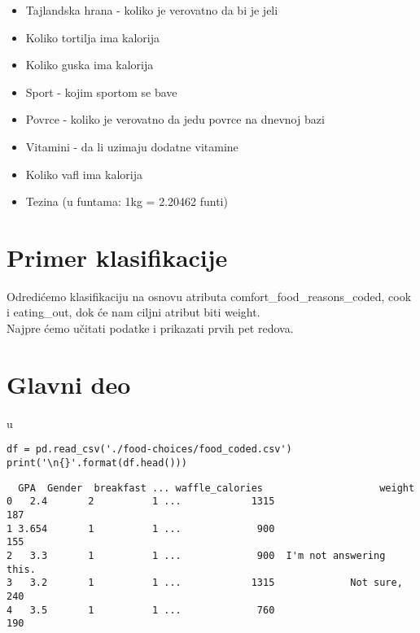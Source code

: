 \documentclass[12pt,a4paper]{article}
\begin{document}
\begin{itemize}
  \item Tajlandska hrana - koliko je verovatno da bi je jeli\\
  \item Koliko tortilja ima kalorija\\
  \item Koliko guska ima kalorija\\
  \item Sport - kojim sportom se bave\\
  \item Povrce - koliko je verovatno da jedu povrce na dnevnoj bazi\\
  \item Vitamini - da li uzimaju dodatne vitamine\\
  \item Koliko vafl ima kalorija\\
  \item Tezina (u funtama: 1kg = 2.20462 funti)\\
\end{itemize}

\section{Primer klasifikacije}

Odredi\' cemo klasifikaciju na osnovu atributa comfort\_food\_reasons\_coded, cook i eating\_out, dok \' ce nam ciljni atribut biti weight.\\

Najpre \' cemo u\v citati podatke i prikazati prvih pet redova.\\

\section{Glavni deo}
u \cite{knjiga1}

\begin{lstlisting}[mathescape=true]
df = pd.read_csv('./food-choices/food_coded.csv')
print('\n{}'.format(df.head()))
\end{lstlisting}

\begin{verbatim}
  GPA  Gender  breakfast ... waffle_calories                    weight
0   2.4       2          1 ...            1315                       187
1 3.654       1          1 ...             900                       155
2   3.3       1          1 ...             900  I'm not answering this.
3   3.2       1          1 ...            1315             Not sure, 240
4   3.5       1          1 ...             760                       190
\end{verbatim}
\end{document}

